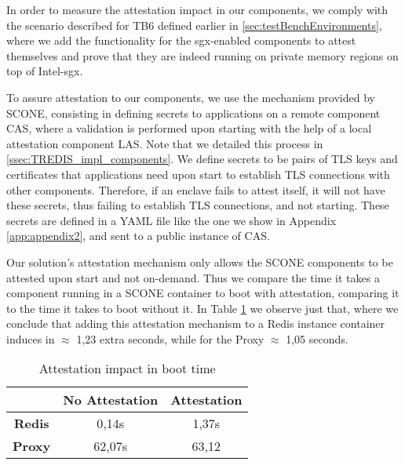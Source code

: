 In order to measure the attestation impact in our components, we comply with the scenario described for TB6 defined earlier in \ref{sec:testBenchEnvironments}, where we add the functionality for the \gls{sgx}-enabled components to attest themselves and prove that they are indeed running on private memory regions on top of Intel-\gls{sgx}. 

To assure attestation to our components, we use the mechanism provided by SCONE, consisting in defining secrets to applications on a remote component CAS, where a validation is performed upon starting with the help of a local attestation component LAS. Note that we detailed this process in \ref{ssec:TREDIS_impl_components}. 
We define secrets to be pairs of TLS keys and certificates that applications need upon start to establish TLS connections with other components. Therefore, if an enclave fails to attest itself, it will not have these secrets, thus failing to establish TLS connections, and not starting. These secrets are defined in a YAML file like the one we show in Appendix \ref{app:appendix2}, and sent to a public instance of CAS. 

Our solution's attestation mechanism only allows the SCONE components to be attested upon start and not on-demand. Thus we compare the time it takes a component running in a SCONE container to boot with attestation, comparing it to the time it takes to boot without it. In Table \ref{table:attestationImpactBoot} we observe just that, where we conclude that adding this attestation mechanism to a Redis instance container induces in $\approx$ 1,23 extra seconds, while for the Proxy $\approx$ 1,05 seconds.

\begin{table}[ht]
	\caption{Attestation impact in boot time} %
	\centering %
	\begin{tabular}{c c c} %
		\hline\hline %
		\textbf{} & \textbf{No Attestation} & \textbf{Attestation} \\ [0.5ex] %
		\hline
		\textbf{Redis} & 0,14s & 1,37s\\
		\hline %
		\textbf{Proxy} & 62,07s & 63,12\\ [1ex] %
		\hline %
	\end{tabular}
	\label{table:attestationImpactBoot} %
\end{table}

